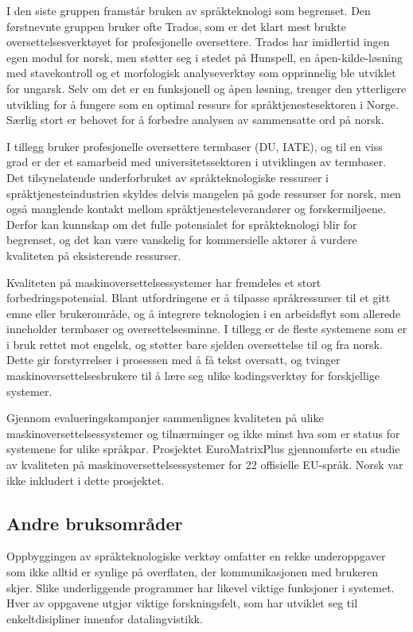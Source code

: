 \begin{multicols}{2}
I den siste gruppen framstår bruken av språkteknologi som begrenset. Den førstnevnte gruppen bruker ofte Trados, som er det klart mest brukte oversettelsesverktøyet for profesjonelle oversettere. Trados har imidlertid ingen egen modul for norsk, men støtter seg i stedet på Hunspell, en åpen-kilde-løsning med stavekontroll og et morfologisk analyseverktøy som opprinnelig ble utviklet for ungarsk. Selv om det er en funksjonell og åpen løsning, trenger den ytterligere utvikling for å fungere som en optimal ressurs for språktjenestesektoren i Norge. Særlig stort er behovet for å forbedre analysen av sammensatte ord på norsk. 

I tillegg bruker profesjonelle oversettere termbaser (DU, IATE), og til en viss grad er der et samarbeid med universitetssektoren i utviklingen av termbaser. Det tilsynelatende underforbruket av språkteknologiske ressurser i språktjenesteindustrien skyldes delvis mangelen på gode ressurser for norsk, men også manglende kontakt mellom språktjenesteleverandører og forskermiljøene. Derfor kan kunnskap om det fulle potensialet for språkteknologi blir for begrenset, og det kan være vanskelig for kommersielle aktører å vurdere kvaliteten på eksisterende ressurser.

Kvaliteten på maskinoversettelsessystemer har fremdeles et stort forbedringspotensial. Blant utfordringene er å tilpasse språkressurser til et gitt emne eller brukerområde, og å integrere teknologien i en arbeidsflyt som allerede inneholder termbaser og oversettelsesminne. I tillegg er de fleste systemene som er i bruk rettet mot engelsk, og støtter bare sjelden oversettelse til og fra norsk. Dette gir forstyrrelser i prosessen med å få tekst oversatt, og tvinger maskinoversettelsesbrukere til å lære seg ulike kodingsverktøy for forskjellige systemer.

Gjennom evalueringskampanjer sammenlignes kvaliteten på ulike maskinoversettelsessystemer og tilnærminger og ikke minst hva som er status for systemene for ulike språkpar.
Prosjektet EuroMatrixPlus gjennomførte en studie av kvaliteten på maskinoversettelsessystemer for 22 offisielle EU-språk.
Norsk var ikke inkludert i dette prosjektet.

\subsection{Andre bruksområder}

Oppbyggingen av språkteknologiske verktøy omfatter en rekke underoppgaver som ikke alltid er synlige på overflaten, der kommunikasjonen med brukeren skjer. Slike underliggende programmer har likevel viktige funksjoner i systemet. Hver av oppgavene utgjør viktige forskningsfelt, som har utviklet seg til enkeltdisipliner innenfor datalingvistikk.


\end{multicols}
